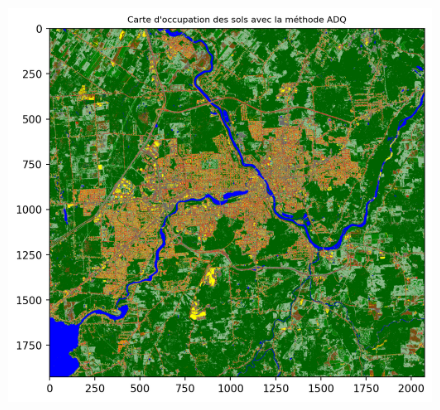 \documentclass[
]{article}
\begin{document}
\label{b9ece539}
\begin{figure}
\centering
\includegraphics[width=5.625in,height=5.22917in]{05-ClassificationsSupervisees_files/figure-html/cell-47-output-1.png}
\caption{}
\end{figure}
\end{document}
